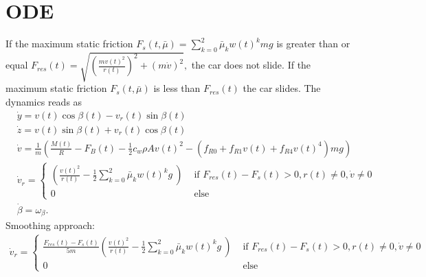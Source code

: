 \documentclass[
10pt, %
a4paper, %
oneside, %
headinclude,footinclude, %
BCOR5mm, %
]{scrartcl}
\begin{document}
\section{ODE}
If the maximum static friction $F_s(t, \bar{\mu}) = \sum_{k=0}^2 \bar{\mu}_k w(t)^k mg $ is greater than or equal $F_{res}(t) = \sqrt{\left(\frac{mv(t)^2}{r(t)}\right)^2+ \left(m \dot{v}\right)^2},$ the car does not slide. 
If the maximum static friction $F_s(t, \bar{\mu})$ is less than $F_{res}(t)$ the car slides. 
The dynamics reads as
\begin{align*}
 &\dot{y} = v(t) \cos\beta(t) -  v_r(t)\sin \beta(t) \\
& \dot{z} = v(t) \sin\beta(t) +  v_r(t)\cos \beta(t) \\
& \dot{v} = \frac{1}{m}\left( \frac{M(t)}{R} - F_B(t) - \frac{1}{2}  c_w  \rho  A v(t)^2 -\left(f_{R0} + f_{R1} v(t) + f_{R4}v(t)^4 \right) m g\right)\\
& \dot{v}_r = \begin{cases} \left( \frac{v(t)^2}{r(t)}  -  \frac{1}{2} \sum_{k=0}^2 \bar{\mu}_k w(t)^k   g\ \right) & \text{ if } F_{res}(t)- F_{s}(t) > 0, r(t) \neq 0, \dot{v} \neq 0\\
0 &   \text{ else }
\end{cases}\\
& \dot{\beta} = \omega_{\beta}.
\end{align*}
Smoothing approach:
\begin{align*}
 \dot{v}_r = \begin{cases} \frac{F_{res}(t)- F_{s}(t)}{5m}\left( \frac{v(t)^2}{r(t)}  -  \frac{1}{2} \sum_{k=0}^2 \bar{\mu}_k w(t)^k   g\ \right) & \text{ if } F_{res}(t)- F_{s}(t) > 0, r(t) \neq 0, \dot{v} \neq 0\\
0 &   \text{ else }
\end{cases}
\end{align*}
\end{document}

